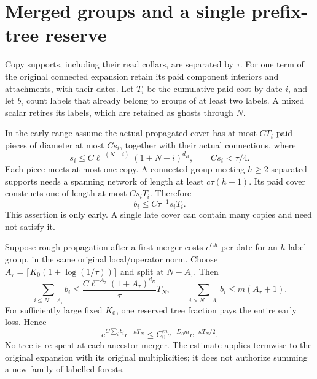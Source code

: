 \section{Merged groups and a single prefix-tree reserve}
\label{ha:forest}

Copy supports, including their read collars, are separated by $\tau$.
For one term of the original connected expansion retain its paid
component interiors and attachments, with their dates.  Let $T_i$ be
the cumulative paid cost by date $i$, and let $b_i$ count labels that
already belong to groups of at least two labels.  A mixed scalar
retires its labels, which are retained as ghosts through $N$.

In the early range assume the actual propagated cover has at most
$CT_i$ paid pieces of diameter at most $Cs_i$, together with their
actual connections, where
\begin{equation}
 s_i\leq C\ell^{-(N-i)}(1+N-i)^{d_R},\qquad Cs_i<\tau/4.
 \label{ha:cover-scale}
\end{equation}
Each piece meets at most one copy.  A connected group meeting $h\geq2$
separated supports needs a spanning network of length at least
$c\tau(h-1)$.  Its paid cover constructs one of length at most
$Cs_iT_i$.  Therefore
\begin{equation}
 b_i\leq C\tau^{-1}s_iT_i.
 \label{ha:prefix-packing}
\end{equation}
This assertion is only early.  A single late cover can contain many
copies and need not satisfy it.

Suppose rough propagation after a first merger costs $e^{Ch}$ per date
for an $h$-label group, in the same original local/operator norm.
Choose $A_\tau=\lceil K_0(1+\log(1/\tau))\rceil$ and split at
$N-A_\tau$.  Then
\begin{equation}
 \sum_{i\leq N-A_\tau}b_i
 \leq\frac{C\ell^{-A_\tau}(1+A_\tau)^{d_R}}{\tau}T_N,
 \qquad
 \sum_{i>N-A_\tau}b_i\leq m(A_\tau+1).
 \label{ha:forest-sums}
\end{equation}
For sufficiently large fixed $K_0$, one reserved tree fraction pays
the entire early loss.  Hence
\begin{equation}
 e^{C\sum_i b_i}e^{-\kappa T_N}
 \leq C_0^m\tau^{-D_0m}e^{-\kappa T_N/2}.
 \label{ha:forest-result}
\end{equation}
No tree is re-spent at each ancestor merger.  The estimate applies
termwise to the original expansion with its original multiplicities;
it does not authorize summing a new family of labelled forests.

